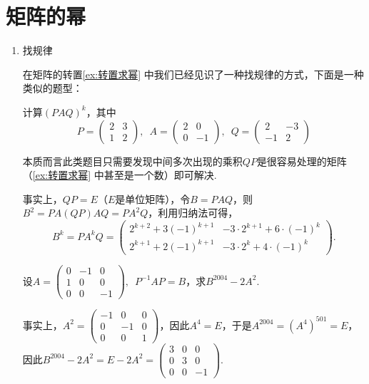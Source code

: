 \section{矩阵的幂} \label{sec:矩阵的幂}

\begin{enumerate}
    \item 找规律

          在矩阵的转置\autoref{ex:转置求幂} 中我们已经见识了一种找规律的方式，下面是一种类似的题型：
          \begin{example}{}{}
              计算$(PAQ)^k$，其中
              \[P=\begin{pmatrix}2 & 3 \\ 1 & 2\end{pmatrix},\enspace A=\begin{pmatrix}2 & 0 \\ 0 & -1\end{pmatrix},\enspace Q=\begin{pmatrix}2 & -3 \\ -1 & 2\end{pmatrix}\]
          \end{example}
          本质而言此类题目只需要发现中间多次出现的乘积$QP$是很容易处理的矩阵（\autoref{ex:转置求幂} 中甚至是一个数）即可解决.

          \begin{solution}
              事实上，$QP=E$（$E$是单位矩阵），令$B=PAQ$，则$B^2=PA(QP)AQ=PA^2Q$，利用归纳法可得，
              \[B^k=PA^kQ=\begin{pmatrix}
                      2^{k+2}+3(-1)^{k+1} & -3\cdot 2^{k+1}+6\cdot (-1)^k \\
                      2^{k+1}+2(-1)^{k+1} & -3\cdot 2^k+4\cdot (-1)^k
                  \end{pmatrix}.\]
          \end{solution}

          \begin{example}{}{}
              设$A=\begin{pmatrix}0 & -1 & 0 \\ 1 & 0 & 0 \\ 0 & 0 & -1 \end{pmatrix},\enspace P^{-1}AP=B$，求$B^{2004}-2A^2$.
          \end{example}
          \begin{solution}
              事实上，$A^2=\begin{pmatrix}
                      -1 & 0 & 0 \\ 0 & -1 & 0 \\ 0 & 0 & 1
                  \end{pmatrix}$，因此$A^4=E$，于是$A^{2004}=(A^4)^{501}=E$，因此$B^{2004}-2A^2=E-2A^2=\begin{pmatrix}
                      3 & 0 & 0 \\ 0 & 3  & 0 \\ 0 & 0 & -1
                  \end{pmatrix}$.
          \end{solution}


\end{enumerate}
